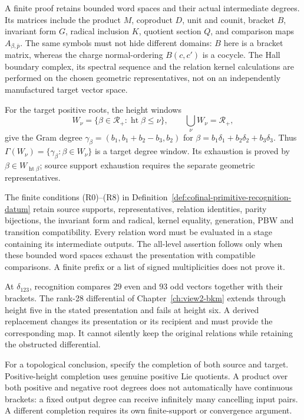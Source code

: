 A finite proof retains bounded word spaces and their actual
intermediate degrees. Its matrices include the product \(M\),
coproduct \(D\), unit and counit, bracket \(B\), invariant form
\(G\), radical inclusion \(K\), quotient section \(Q\), and
comparison maps \(A_{\beta,\bar p}\). The same symbols must not
hide different domains: \(B\) here is a bracket matrix, whereas
the charge normal-ordering \(B(c,c')\) is a cocycle.
The Hall boundary complex, its spectral sequence and the relation
kernel calculations are performed on the chosen geometric
representatives, not on an independently manufactured target vector
space.

For the target positive roots, the height windows
\[
 W_\nu=\{\beta\in\mathcal R_+:
                    \operatorname{ht}\beta\le\nu\},\qquad
 \bigcup_\nu W_\nu=\mathcal R_+,
\]
give the Gram degree
\(\gamma_\beta=(b_1,b_1+b_2-b_3,b_2)\) for
\(\beta=b_1\delta_1+b_2\delta_2+b_3\delta_3\).
Thus \(\Gamma(W_\nu)=\{\gamma_\beta:\beta\in W_\nu\}\)
is a target degree window. Its exhaustion is proved by
\(\beta\in W_{\operatorname{ht}\beta}\); source support
exhaustion requires the separate geometric representatives.

The finite conditions \textup{(R0)}--\textup{(R8)} in
Definition~\ref{def:cofinal-primitive-recognition-datum} retain
source supports, representatives, relation identities, parity
bijections, the invariant form and radical, kernel equality,
generation, PBW and transition compatibility. Every relation word
must be evaluated in a stage containing its intermediate outputs.
The all-level assertion follows only when these bounded word spaces
exhaust the presentation with compatible comparisons. A finite
prefix or a list of signed multiplicities does not prove it.

At \(\delta_{123}\), recognition compares \(29\) even and
\(93\) odd vectors together with their brackets. The rank-28
differential of Chapter~\ref{ch:view2-bkm} extends through height
five in the stated presentation and fails at height six. A derived
replacement changes its presentation or its recipient and must
provide the corresponding map. It cannot silently keep the original
relations while retaining the obstructed differential.

For a topological conclusion, specify the completion of both
source and target. Positive-height completion uses genuine
positive Lie quotients. A product over both positive and negative
root degrees does not automatically have continuous brackets:
a fixed output degree can receive infinitely many cancelling input
pairs. A different completion requires its own finite-support or
convergence argument.

